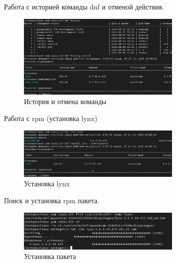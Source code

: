\documentclass[
  12pt,
  a4paper,
  DIV=11,
  numbers=noendperiod]{scrreprt}
\begin{document}
Работа с историей команды dnf и отменой действия.

\begin{figure}

{\centering \includegraphics[width=0.7\textwidth,height=\textheight]{image/12.png}

}

\caption{История и отмена команды}

\end{figure}%

Работа с rpm (установка lynx)

\begin{figure}

{\centering \includegraphics[width=0.7\textwidth,height=\textheight]{image/13.png}

}

\caption{Установка lynx}

\end{figure}%

Поиск и установка rpm пакета.

\begin{figure}

{\centering \includegraphics[width=0.7\textwidth,height=\textheight]{image/14.png}

}

\caption{Установка пакета}

\end{figure}%
\end{document}
